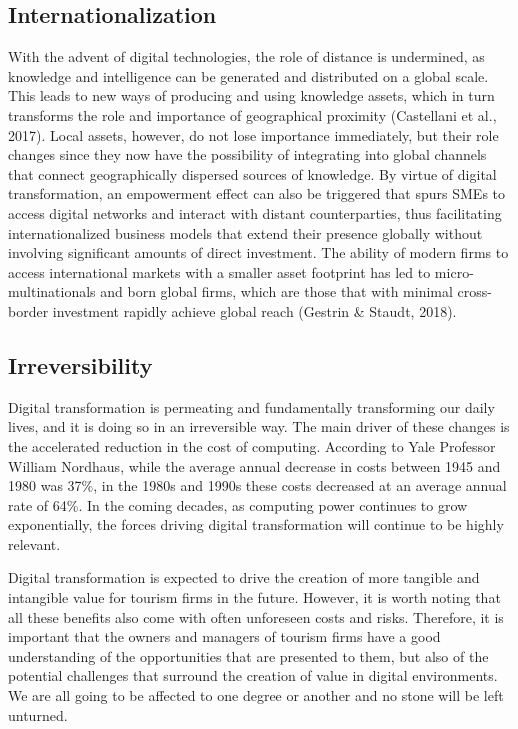 \documentclass[
  letterpaper,
  DIV=11,
  numbers=noendperiod]{scrreprt}
\begin{document}
\hypertarget{internationalization}{%
\subsection{Internationalization}\label{internationalization}}

With the advent of digital technologies, the role of distance is
undermined, as knowledge and intelligence can be generated and
distributed on a global scale. This leads to new ways of producing and
using knowledge assets, which in turn transforms the role and importance
of geographical proximity (Castellani et al., 2017). Local assets,
however, do not lose importance immediately, but their role changes
since they now have the possibility of integrating into global channels
that connect geographically dispersed sources of knowledge. By virtue of
digital transformation, an empowerment effect can also be triggered that
spurs SMEs to access digital networks and interact with distant
counterparties, thus facilitating internationalized business models that
extend their presence globally without involving significant amounts of
direct investment. The ability of modern firms to access international
markets with a smaller asset footprint has led to micro-multinationals
and born global firms, which are those that with minimal cross-border
investment rapidly achieve global reach (Gestrin \& Staudt, 2018).

\hypertarget{irreversibility}{%
\subsection{Irreversibility}\label{irreversibility}}

Digital transformation is permeating and fundamentally transforming our
daily lives, and it is doing so in an irreversible way. The main driver
of these changes is the accelerated reduction in the cost of computing.
According to Yale Professor William Nordhaus, while the average annual
decrease in costs between 1945 and 1980 was 37\%, in the 1980s and 1990s
these costs decreased at an average annual rate of 64\%. In the coming
decades, as computing power continues to grow exponentially, the forces
driving digital transformation will continue to be highly relevant.

Digital transformation is expected to drive the creation of more
tangible and intangible value for tourism firms in the future. However,
it is worth noting that all these benefits also come with often
unforeseen costs and risks. Therefore, it is important that the owners
and managers of tourism firms have a good understanding of the
opportunities that are presented to them, but also of the potential
challenges that surround the creation of value in digital environments.
We are all going to be affected to one degree or another and no stone
will be left unturned.
\end{document}
